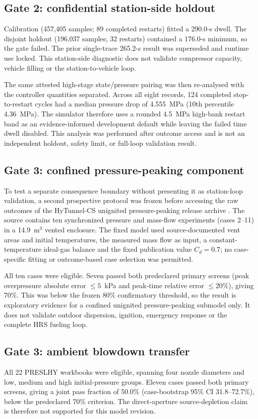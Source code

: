 \documentclass[12pt,a4paper]{article}
\begin{document}
\subsection{Gate 2: confidential station-side holdout}
Calibration (457,405 samples; 89 completed restarts) fitted a 290.0-s dwell.
The disjoint holdout (196,037 samples; 32 restarts) contained a 176.0-s minimum,
so the gate failed. The prior single-trace 265.2-s result was superseded and
runtime use locked. This station-side diagnostic does not validate compressor
capacity, vehicle filling or the station-to-vehicle loop.

The same attested high-stage state/pressure pairing was then re-analysed with
the controller quantities separated. Across all eight records, 124 completed
stop-to-restart cycles had a median pressure drop of 4.555~MPa (10th percentile
4.36~MPa). The simulator therefore uses a rounded 4.5~MPa high-bank restart
band as an evidence-informed development default while leaving the failed time
dwell disabled. This analysis was performed after outcome access and is not an
independent holdout, safety limit, or full-loop validation result.

\subsection{Gate 3: confined pressure-peaking component}
To test a separate consequence boundary without presenting it as station-loop
validation, a second prospective protocol was frozen before accessing the raw
outcomes of the HyTunnel-CS unignited pressure-peaking release archive
\cite{lach2020}. The source contains ten synchronized pressure and mass-flow
experiments (cases 2--11) in a 14.9~m$^3$ vented enclosure. The fixed model
used source-documented vent areas and initial temperatures, the measured mass
flow as input, a constant-temperature ideal-gas balance and the fixed
publication value $C_d=0.7$; no case-specific fitting or outcome-based case
selection was permitted.

All ten cases were eligible. Seven passed both predeclared primary screens
(peak overpressure absolute error $\leq5$~kPa and peak-time relative error
$\leq20\%$), giving 70\%. This was below the frozen 80\% confirmatory
threshold, so the result is exploratory evidence for a confined unignited
pressure-peaking submodel only. It does not validate outdoor dispersion,
ignition, emergency response or the complete HRS fueling loop.

\subsection{Gate 3: ambient blowdown transfer}
All 22 PRESLHY workbooks were eligible, spanning four nozzle diameters and low,
medium and high initial-pressure groups. Eleven cases passed both primary screens,
giving a joint pass fraction of 50.0\% (case-bootstrap 95\% CI 31.8--72.7\%), below
the predeclared 70\% criterion. The direct-aperture source-depletion claim is
therefore not supported for this model revision.
\end{document}
